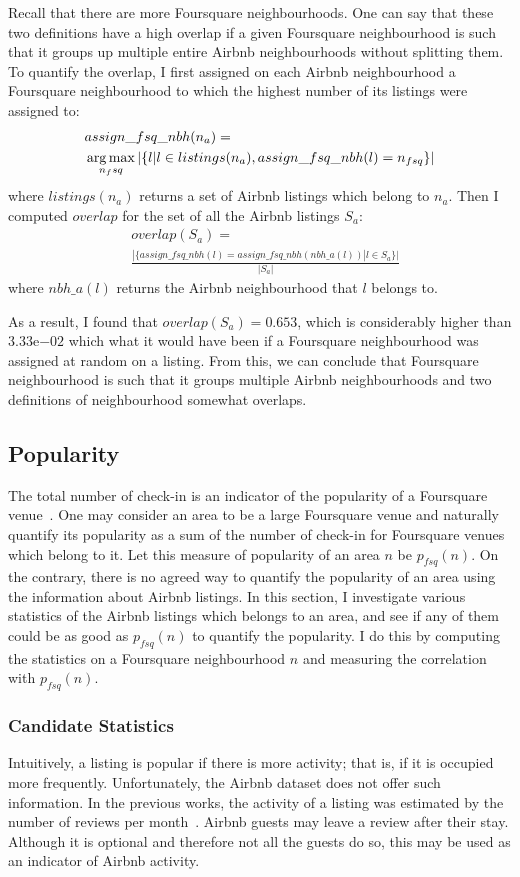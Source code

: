Recall that there are more Foursquare neighbourhoods. One can say that these two definitions have a high overlap if a given Foursquare neighbourhood is such that it groups up multiple entire Airbnb neighbourhoods without splitting them. To quantify the overlap, I first assigned on each Airbnb neighbourhood a Foursquare neighbourhood to which the highest number of its listings were assigned to:
\begin{align*}
&assign\_fsq\_nbh(n_{a}) = \\
&\operatorname*{arg\,max}_{n_fsq} | \{ l | l \in listings(n_{a}), assign\_fsq\_nbh(l) = n_{fsq}\} |
\end{align*}
where $listings(n_{a})$ returns a set of Airbnb listings which belong to $n_{a}$. Then I computed $overlap$ for the set of all the Airbnb listings $S_a$:
\begin{align*}
&overlap(S_a) = \\
& \frac{|\{ assign\_fsq\_nbh(l) = assign\_fsq\_nbh(nbh\_a(l)) | l \in S_a \}|}{|S_a|}
\end{align*}
where $nbh\_a(l)$ returns the Airbnb neighbourhood that $l$ belongs to.

As a result, I found that $overlap(S_a) = 0.653$, which is considerably higher than $3.33\mathrm{e}{-02}$ which what it would have been if a Foursquare neighbourhood was assigned at random on a listing. From this, we can conclude that Foursquare neighbourhood is such that it groups multiple Airbnb neighbourhoods and two definitions of neighbourhood somewhat overlaps.
\subsection{Popularity}
The total number of check-in is an indicator of the popularity of a Foursquare venue~\citep{noulas2011empirical}. One may consider an area to be a large Foursquare venue and naturally quantify its popularity as a sum of the number of check-in for Foursquare venues which belong to it. Let this measure of popularity of an area $n$ be $p_{fsq}(n)$.
On the contrary, there is no agreed way to quantify the popularity of an area using the information about Airbnb listings. In this section, I investigate various statistics of the Airbnb listings which belongs to an area, and see if any of them could be as good as $p_{fsq}(n)$ to quantify the popularity. I do this by computing the statistics on a Foursquare neighbourhood $n$ and measuring the correlation with $p_{fsq}(n)$.
\subsubsection{Candidate Statistics}
Intuitively, a listing is popular if there is more activity; that is, if it is occupied more frequently. Unfortunately, the Airbnb dataset does not offer such information. In the previous works, the activity of a listing was estimated by the number of reviews per month~\citep{cansoy2016gets, insideairbnb}. Airbnb guests may leave a review after their stay. Although it is optional and therefore not all the guests do so, this may be used as an indicator of Airbnb activity. 

